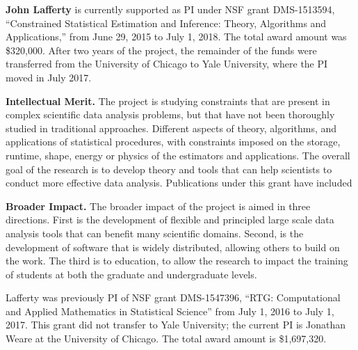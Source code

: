 \vskip10pt \textbf{John Lafferty} is currently supported as PI under NSF
grant DMS-1513594, ``Constrained Statistical Estimation and Inference:
Theory, Algorithms and Applications,'' from June 29, 2015 to July 1,
2018. The total award amount was \$320,000. After two years of the
project, the remainder of the funds were transferred from the
University of Chicago to Yale University, where the PI moved in July
2017.

{\bf Intellectual Merit.}  The project is studying constraints that
are present in complex scientific data analysis problems, but that
have not been thoroughly studied in traditional approaches. Different
aspects of theory, algorithms, and applications of statistical
procedures, with constraints imposed on the storage, runtime, shape,
energy or physics of the estimators and applications. The overall goal
of the research is to develop theory and tools that can help
scientists to conduct more effective data analysis. Publications under
this grant have included \citep{ChatterjeeL18,MishraILH18,
abs-1803-01302,MishraLH17,YangB0L16,ChatterjeeDLZ16,ZhengL16,
MishraZLH15,ZhengL15,ZhuL14,Bonak18}


{\bf Broader Impact.} The broader impact of the project is aimed in
three directions. First is the development of flexible and principled
large scale data analysis tools that can benefit many scientific
domains.  Second, is the development of software that is widely
distributed, allowing others to build on the work. The third is to
education, to allow the research to impact the training of students at
both the graduate and undergraduate levels.


\vskip10pt \noindent Lafferty was previously PI of NSF grant
DMS-1547396, ``RTG: Computational and Applied Mathematics in
Statistical Science'' from July 1, 2016 to July 1, 2017. This grant
did not transfer to Yale University; the current PI is Jonathan Weare
at the University of Chicago. The total award amount is \$1,697,320.

%

